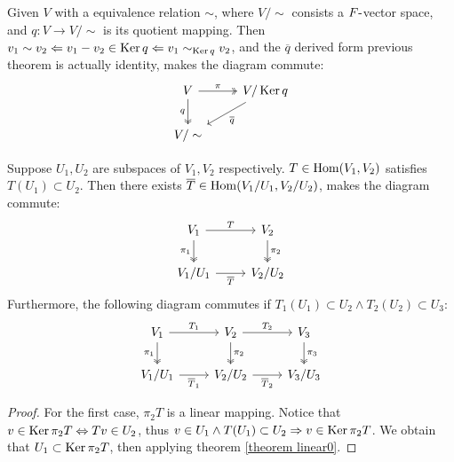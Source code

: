 \begin{theorem}
    Given $V$ with a equivalence relation $\sim$, where $V / \sim$ consists a $F \mbox{-}$vector space, and $q: V \to V/\sim$ is its quotient mapping. Then $v_1 \sim v_2 \Leftarrow v_1 - v_2 \in \operatorname{Ker} q \Leftarrow v_1 \sim_{\operatorname{Ker} q} v_2$, and the $\overline{q}$ derived form previous theorem is actually identity, makes the diagram commute:
    \[
        \begin{tikzcd}
            V \arrow[two heads, r, "\pi"] \arrow[two heads, d, "q"'] 
            & V / \Ker q \arrow[ld, "\overline{q}"] 
            \\
            V / \sim
        \end{tikzcd}
    \]
\end{theorem}










\begin{theorem}
    Suppose $U_1, U_2$ are subspaces of $V_1, V_2$ respectively. $T \in \operatorname{Hom}(V_1, V_2)$ satisfies $T(U_1) \subset U_2$. Then there exists $\overline{T} \in \operatorname{Hom}(V_1 / U_1, V_2 / U_2)$, makes the diagram commute:
    \[
        \begin{tikzcd}
            V_1 \arrow[r, "T"] \arrow[two heads, d, "\pi_1"']
            & V_2 \arrow[two heads, d, "\pi_2"]
            \\
            V_1 / U_1 \arrow[r, "\overline{T}"']
            & V_2 / U_2
        \end{tikzcd}
    \]
    Furthermore, the following diagram commutes if $T_1(U_1) \subset U_2 \land T_2(U_2) \subset U_3$:
    \[
        \begin{tikzcd}
            V_1 \arrow[r, "T_1"] \arrow[two heads, d, "\pi_1"']
            & V_2 \arrow[r, "T_2"] \arrow[two heads, d, "\pi_2"]
            & V_3 \arrow[two heads, d, "\pi_3"]
            \\
            V_1 / U_1 \arrow[r, "\overline{T}_1"']
            & V_2 / U_2 \arrow[r, "\overline{T}_2"']
            & V_3 / U_3
        \end{tikzcd}
    \]
\end{theorem}

\begin{proof}
    For the first case, $\pi_2 T$ is a linear mapping. Notice that $v \in \operatorname{Ker} \pi_2 T \Leftrightarrow Tv \in U_2$, thus $v \in U_1 \land T(U_1) \subset U_2 \Rightarrow v \in \operatorname{Ker} \pi_2 T$. We obtain that $U_1 \subset \operatorname{Ker} \pi_2 T$, then applying theorem \ref{theorem linear0}.
\end{proof}








